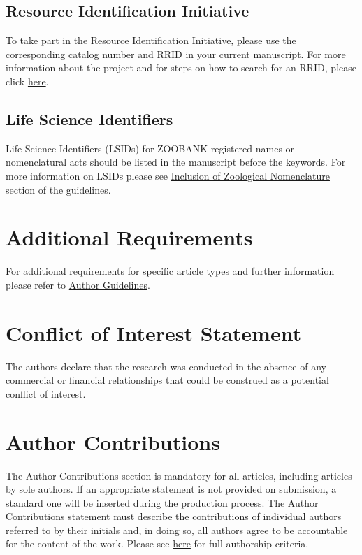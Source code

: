 \documentclass[utf8]{frontiersSCNS} %
\begin{document}
\subsection{Resource Identification Initiative}
To take part in the Resource Identification Initiative, please use the corresponding catalog number and RRID in your current manuscript. For more information about the project and for steps on how to search for an RRID, please click \href{http://www.frontiersin.org/files/pdf/letter_to_author.pdf}{here}.

\subsection{Life Science Identifiers}
Life Science Identifiers (LSIDs) for ZOOBANK registered names or nomenclatural acts should be listed in the manuscript before the keywords. For more information on LSIDs please see \href{http://www.frontiersin.org/about/AuthorGuidelines#InclusionofZoologicalNomenclature}{Inclusion of Zoological Nomenclature} section of the guidelines.


\section{Additional Requirements}

For additional requirements for specific article types and further information please refer to \href{http://www.frontiersin.org/about/AuthorGuidelines#AdditionalRequirements}{Author Guidelines}.

\section*{Conflict of Interest Statement}

The authors declare that the research was conducted in the absence of any commercial or financial relationships that could be construed as a potential conflict of interest.

\section*{Author Contributions}

The Author Contributions section is mandatory for all articles, including articles by sole authors. If an appropriate statement is not provided on submission, a standard one will be inserted during the production process. The Author Contributions statement must describe the contributions of individual authors referred to by their initials and, in doing so, all authors agree to be accountable for the content of the work. Please see  \href{http://home.frontiersin.org/about/author-guidelines#AuthorandContributors}{here} for full authorship criteria.
\end{document}
